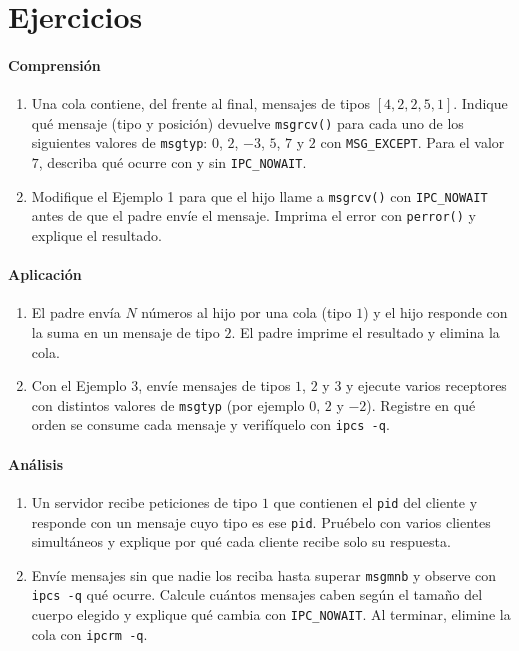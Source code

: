 \documentclass[12pt,a4paper]{article}
\begin{document}
\section{Ejercicios}
\paragraph{Comprensión}
\begin{enumerate}
    \item Una cola contiene, del frente al final, mensajes de tipos $[4, 2, 2, 5, 1]$. Indique qué mensaje (tipo y posición) devuelve \texttt{msgrcv()} para cada uno de los siguientes valores de \texttt{msgtyp}: $0$, $2$, $-3$, $5$, $7$ y $2$ con \texttt{MSG\_EXCEPT}. Para el valor $7$, describa qué ocurre con y sin \texttt{IPC\_NOWAIT}.
    \item Modifique el Ejemplo 1 para que el hijo llame a \texttt{msgrcv()} con \texttt{IPC\_NOWAIT} antes de que el padre envíe el mensaje. Imprima el error con \texttt{perror()} y explique el resultado.
\end{enumerate}

\paragraph{Aplicación}
\begin{enumerate}[resume]
    \item El padre envía $N$ números al hijo por una cola (tipo $1$) y el hijo responde con la suma en un mensaje de tipo $2$. El padre imprime el resultado y elimina la cola.
    \item Con el Ejemplo 3, envíe mensajes de tipos $1$, $2$ y $3$ y ejecute varios receptores con distintos valores de \texttt{msgtyp} (por ejemplo $0$, $2$ y $-2$). Registre en qué orden se consume cada mensaje y verifíquelo con \texttt{ipcs -q}.
\end{enumerate}

\paragraph{Análisis}
\begin{enumerate}[resume]
    \item Un servidor recibe peticiones de tipo $1$ que contienen el \texttt{pid} del cliente y responde con un mensaje cuyo tipo es ese \texttt{pid}. Pruébelo con varios clientes simultáneos y explique por qué cada cliente recibe solo su respuesta.
    \item Envíe mensajes sin que nadie los reciba hasta superar \texttt{msgmnb} y observe con \texttt{ipcs -q} qué ocurre. Calcule cuántos mensajes caben según el tamaño del cuerpo elegido y explique qué cambia con \texttt{IPC\_NOWAIT}. Al terminar, elimine la cola con \texttt{ipcrm -q}.
\end{enumerate}
\end{document}
